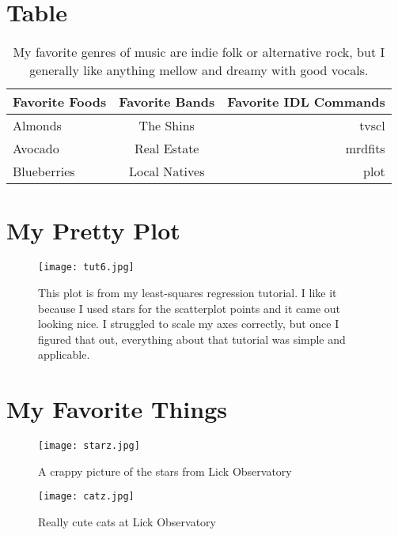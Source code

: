 \documentclass[a4paper]{article}
\begin{document}
\section{Table}
\begin{table}[H]
\center
\begin{tabular} {|l|c|r|} 
\hline
Favorite Foods & Favorite Bands & Favorite IDL Commands \\\hline
Almonds & The Shins & tvscl \\
Avocado & Real Estate & mrdfits \\
Blueberries & Local Natives & plot \\\hline
\end{tabular}
\caption{\label{tab:widgets}My favorite genres of music are indie folk or alternative rock, but I generally like anything mellow and dreamy with good vocals.}
\end{table}


\section{My Pretty Plot}
\begin{figure}[!htb]
  \centering
  \texttt{[image: tut6.jpg]}
  \captionsetup{width=0.7\textwidth}
   \caption{This plot is from my least-squares regression tutorial. I like it because I used stars for the scatterplot points and it came out looking nice. I struggled to scale my axes correctly, but once I figured that out, everything about that tutorial was simple and applicable.}
\end{figure}


\section{My Favorite Things}
\begin{figure}[!htb]
\centering
\begin{minipage}[!htb]{0.42\linewidth}
\texttt{[image: starz.jpg]}
\caption{A crappy picture of the stars from Lick Observatory}
\label{fig:minipage1}
\end{minipage}
\quad
\begin{minipage}[!htb]{0.45\linewidth}
\texttt{[image: catz.jpg]}
\caption{Really cute cats at Lick Observatory}
\label{fig:minipage2}
\end{minipage}
\end{figure}
\end{document}

